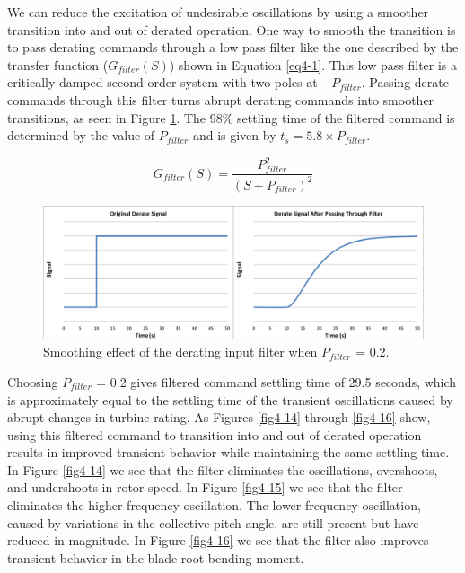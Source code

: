 We can reduce the excitation of undesirable oscillations by using a smoother transition into and out of derated operation. One way to smooth the transition is to pass derating commands through a low pass filter like the one described by the transfer function ($G_{filter}(S)$) shown in Equation \ref{eq4-1}. This low pass filter is a critically damped second order system with two poles at $-P_{filter}$. Passing derate commands through this filter turns abrupt derating commands into smoother transitions, as seen in Figure \ref{fig4-13}. The 98$\%$ settling time of the filtered command is determined by the value of $P_{filter}$ and is given by $t_s = 5.8\times P_{filter}$.

\begin{equation}
	G_{filter}(S)=\dfrac{P_{filter}^2}{(S+P_{filter})^2} \label{eq4-1}
\end{equation}

\begin{figure}[htb]
	\centering
		\includegraphics[width = \linewidth]{Figures/ch4Figures/fig4-13.png}
	\caption{Smoothing effect of the derating input filter when $P_{filter}$  = 0.2.}
	\label{fig4-13}
\end{figure}

Choosing $P_{filter}$ = 0.2 gives filtered command settling time of 29.5 seconds, which is approximately equal to the settling time of the transient oscillations caused by abrupt changes in turbine rating. As Figures \ref{fig4-14} through \ref{fig4-16} show, using this filtered command to transition into and out of derated operation results in improved transient behavior while maintaining the same settling time. In Figure \ref{fig4-14} we see that the filter eliminates the oscillations, overshoots, and undershoots in rotor speed. In Figure \ref{fig4-15} we see that the filter eliminates the higher frequency oscillation. The lower frequency oscillation, caused by variations in the collective pitch angle, are still present but have reduced in magnitude. In Figure \ref{fig4-16} we see that the filter also improves transient behavior in the blade root bending moment.

